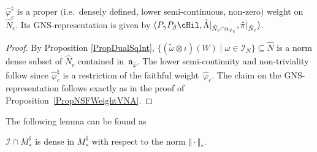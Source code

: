 \begin{prop}\label{PropNSFWeightReduced}
 $\hat{\varphi}_c^\natural$  is a   proper $($i.e.\ densely defined, lower semi-continuous, non-zero$)$ weight on $\hat{N}_c$. Its GNS-representation is given by $(P_\gamma P_\beta \cHil, \hat{\Lambda} \vert_{\hat{N}_c \cap \mathfrak{n}_{\hat{\varphi}_c}}, \hat{\pi}\vert_{\hat{N}_c})$.
\end{prop}
\begin{proof}
By Proposition \ref{PropDualSqInt}, $\{ (\tilde{\omega} \otimes \iota)(W) \mid \omega \in \mathcal{I}_N \} \subseteq \hat{N}$ is a norm dense subset of $\hat{N}_c$ contained in~$\mathfrak{n}_{\hat{\varphi}}$. The lower semi-continuity and non-triviality  follow since  $\hat{\varphi}_c^\natural$ is a restriction of the faithful weight~$\hat{\varphi}_c$. The claim on the GNS-representation follows exactly as in the proof of Proposi\-tion~\ref{PropNSFWeightVNA}.
\end{proof}

The following lemma can be found as \cite[Lemma 4.2]{Kus}

\begin{lem}\label{LemDensity}
 $\mathcal{I} \cap M_\ast^\sharp$ is dense in $M_\ast^\sharp$ with respect to the norm $\Vert \cdot \Vert_\ast$.
\end{lem}


